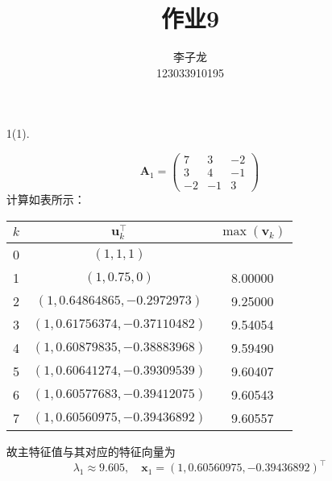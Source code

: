 \documentclass{sjtuarticle}
\title{作业9}
\author{李子龙\\123033910195}
\begin{document}
\maketitle


\begin{itemize}
    \item[1(1).] \begin{solution}
        \begin{equation*}
        \mathbf{A}_1=\begin{pmatrix}
            7 & 3 & -2 \\ 3 & 4 & -1 \\ -2 & -1 & 3
        \end{pmatrix}
    \end{equation*}
    计算如表所示：
    \begin{table}[h]
        \centering
        \begin{tabular}{ccc}
            \toprule
            $k$ & $\mathbf{u}_k^\top$ & $\max(\mathbf{v}_k)$ \\
            \midrule
            0 & $(1,1,1)$ & \\
1     &   $(1  , 0.75       , 0         )$    & 8.00000 \\
2     &   $( 1 , 0.64864865 , -0.2972973 )$   & 9.25000 \\
3     &   $( 1 , 0.61756374 , -0.37110482)$   & 9.54054 \\
4     &   $( 1 , 0.60879835 , -0.38883968)$   & 9.59490 \\
5     &   $( 1 , 0.60641274 , -0.39309539)$   & 9.60407 \\
6     &   $( 1 , 0.60577683 , -0.39412075)$   & 9.60543 \\
7     &   $( 1 , 0.60560975 , -0.39436892)$   & 9.60557 \\
            \bottomrule
        \end{tabular}
    \end{table}

    故主特征值与其对应的特征向量为
    \begin{equation*}
        \lambda_1\approx 9.605,\quad \mathbf{x}_1=( 1 , 0.60560975 , -0.39436892)^\top
    \end{equation*}
    \end{solution}


\end{itemize}
\end{document}
